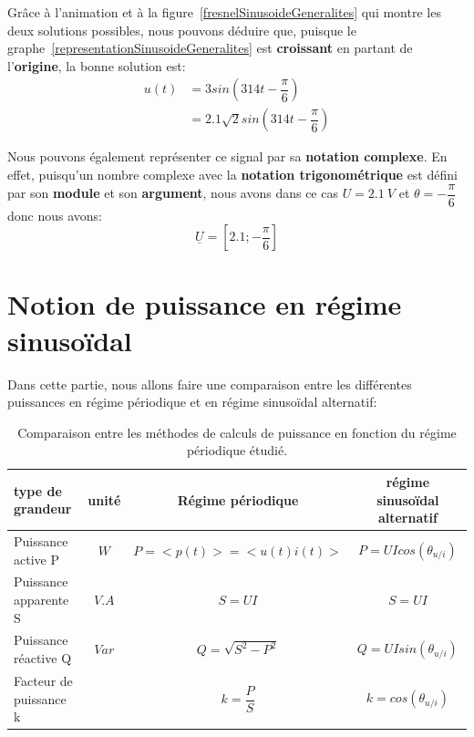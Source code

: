 \documentclass[12pt,a4paper,openany]{book}
\begin{document}
Grâce à l'animation et à la figure~\ref{fresnelSinusoideGeneralites} qui montre les deux solutions possibles, nous pouvons déduire que, puisque le graphe~\ref{representationSinusoideGeneralites} est \textbf{croissant} en partant de l'\textbf{origine}, la bonne solution est:
\begin{align*}
u(t) & = 3sin\left(314t - \dfrac{\pi}{6}\right)\\
	 & = 2.1\sqrt{2}sin\left(314t - \dfrac{\pi}{6}\right)
\end{align*}

Nous pouvons également représenter ce signal par sa \textbf{notation complexe}. En effet, puisqu'un nombre complexe avec la \textbf{notation trigonométrique} est défini par son \textbf{module} et son \textbf{argument}, nous avons dans ce cas $ U = 2.1~V $ et $ \theta = -\dfrac{\pi}{6} $ donc nous avons:
\begin{equation*}
\underline{U} = \left[2.1; -\dfrac{\pi}{6}\right]
\end{equation*}

\section{Notion de puissance en régime sinusoïdal}

Dans cette partie, nous allons faire une comparaison entre les différentes puissances en régime périodique et en régime sinusoïdal alternatif:
\begin{table}[!h]
\begin{center}
\begin{tabular}{|l|c|c|c|} %
\hline type de grandeur & unité & Régime périodique & régime sinusoïdal alternatif\\
\hline Puissance active P & $ W $ & $ P  = <p(t)> = <u(t)i(t)> $ & $ P = UIcos(\theta_{u/i}) $\\
\hline Puissance apparente S & $ V.A $ & $ S = UI $ & $ S = UI $\\
\hline Puissance réactive Q & $ Var $ & $ Q = \sqrt{S^{2} - P^{2}} $ & $ Q = UIsin(\theta_{u/i}) $\\
\hline Facteur de puissance k &  & $ k = \dfrac{P}{S} $ & $ k = cos(\theta_{u/i}) $\\
\hline
\end{tabular}
\caption{Comparaison entre les méthodes de calculs de puissance en fonction du régime périodique étudié.}
\label{tableauComparaisonPuissances}
\end{center}
\end{table}
\end{document}
